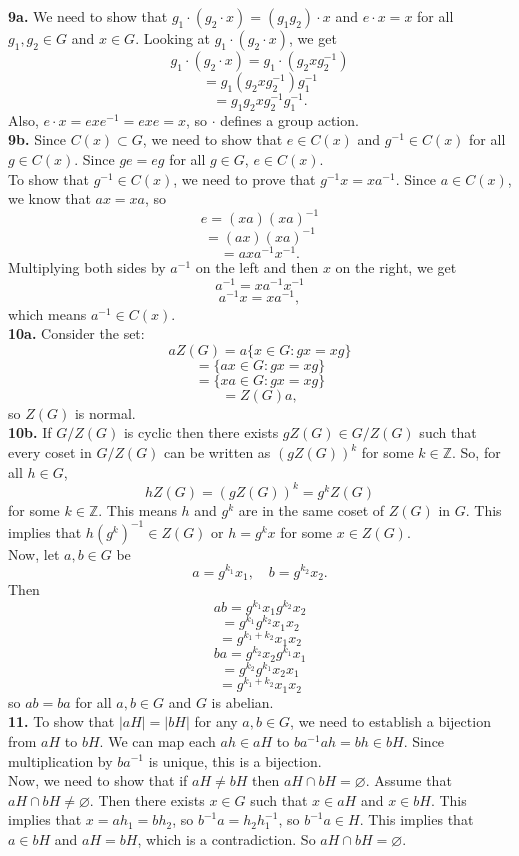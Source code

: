 \documentclass{article}
\newcommand{\Z}{\mathbb{Z}}
\begin{document}
\textbf{9a.} We need to show that $g_1 \cdot (g_2 \cdot x) = (g_1g_2) \cdot x$ and $e \cdot x = x$ for all $g_1, g_2 \in G$ and $x \in G$. Looking at $g_1 \cdot (g_2 \cdot x)$, we get
$$g_1 \cdot (g_2 \cdot x) = g_1 \cdot (g_2xg_2^{-1})$$
$$= g_1(g_2xg_2^{-1})g_1^{-1}$$
$$= g_1g_2xg_2^{-1}g_1^{-1}.$$
Also, $e\cdot x = exe^{-1} = exe = x$, so $\cdot$ defines a group action. \\

\textbf{9b.} Since $C(x) \subset G$, we need to show that $e \in C(x)$ and $g^{-1} \in C(x)$ for all $g \in C(x)$. Since $ge = eg$ for all $g \in G$, $e \in C(x)$. \\

To show that $g^{-1} \in C(x)$, we need to prove that $g^{-1}x = xa^{-1}$. Since $a \in C(x)$, we know that $ax = xa$, so
$$e = (xa)(xa)^{-1}$$
$$= (ax)(xa)^{-1}$$
$$= axa^{-1}x^{-1}.$$
Multiplying both sides by $a^{-1}$ on the left and then $x$ on the right, we get
$$a^{-1} = xa^{-1}x^{-1}$$
$$a^{-1}x = xa^{-1},$$
which means $a^{-1} \in C(x)$. \\

\textbf{10a.} Consider the set:
$$aZ(G) = a\{x \in G: gx = xg\}$$
$$= \{ax \in G: gx = xg\}$$
$$= \{xa \in G: gx = xg\}$$
$$= Z(G)a,$$
so $Z(G)$ is normal. \\

\textbf{10b.} If $G/Z(G)$ is cyclic then there exists $gZ(G) \in G/Z(G)$ such that every coset in $G/Z(G)$ can be written as $(gZ(G))^k$ for some $k \in \Z$. So, for all $h \in G$,
$$hZ(G) = (gZ(G))^k = g^kZ(G)$$
for some $k \in \Z$. This means $h$ and $g^k$ are in the same coset of $Z(G)$ in $G$. This implies that $h(g^k)^{-1} \in Z(G)$ or $h = g^kx$ for some $x \in Z(G)$. \\

Now, let $a, b \in G$ be
$$a = g^{k_1}x_1, \quad b = g^{k_2}x_2.$$
Then
$$ab = g^{k_1}x_1g^{k_2}x_2$$
$$= g^{k_1}g^{k_2}x_1x_2$$
$$= g^{k_1 + k_2}x_1x_2$$
$$ba = g^{k_2}x_2g^{k_1}x_1$$
$$= g^{k_2}g^{k_1}x_2x_1$$
$$= g^{k_1 + k_2}x_1x_2$$
so $ab = ba$ for all $a, b \in G$ and $G$ is abelian. \\

\textbf{11.} To show that $|aH| = |bH|$ for any $a, b \in G$, we need to establish a bijection from $aH$ to $bH$. We can map each $ah \in aH$ to $ba^{-1}ah = bh \in bH$. Since multiplication by $ba^{-1}$ is unique, this is a bijection. \\

Now, we need to show that if $aH \neq bH$ then $aH \cap bH = \varnothing$. Assume that $aH \cap bH \neq \varnothing$. Then there exists $x \in G$ such that $x \in aH$ and $x \in bH$. This implies that $x = ah_1 = bh_2$, so $b^{-1}a = h_2h_1^{-1}$, so $b^{-1}a \in H$. This implies that $a \in bH$ and $aH = bH$, which is a contradiction. So $aH \cap bH = \varnothing$.
\end{document}
